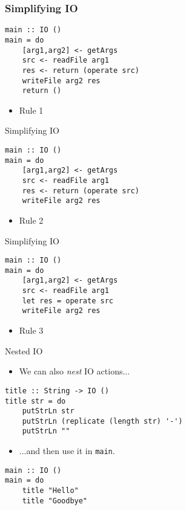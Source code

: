 \documentclass{beamer}
\begin{document}
\begin{frame}[containsverbatim]
\frametitle{Simplifying IO}
\begin{lstlisting}
main :: IO ()
main = do
    [arg1,arg2] <- getArgs
    src <- readFile arg1
    res <- return (operate src)
    writeFile arg2 res
    return ()
\end{lstlisting}
\begin{itemize}
\item Rule 1
\end{itemize}
\end{frame}

\begin{frame}[containsverbatim]{Simplifying IO}
\begin{lstlisting}
main :: IO ()
main = do
    [arg1,arg2] <- getArgs
    src <- readFile arg1
    res <- return (operate src)
    writeFile arg2 res
\end{lstlisting}
\begin{itemize}
\item Rule 2
\end{itemize}
\end{frame}

\begin{frame}[containsverbatim]{Simplifying IO}
\begin{lstlisting}
main :: IO ()
main = do
    [arg1,arg2] <- getArgs
    src <- readFile arg1
    let res = operate src
    writeFile arg2 res
\end{lstlisting}
\begin{itemize}
\item Rule 3
\end{itemize}
\end{frame}

\begin{frame}[containsverbatim]{Nested IO}
\begin{itemize}
\item We can also \emph{nest} IO actions...
\end{itemize}
\begin{lstlisting}
title :: String -> IO ()
title str = do
    putStrLn str
    putStrLn (replicate (length str) '-')
    putStrLn ""
\end{lstlisting}
\begin{itemize}
\item ...and then use it in \lstinline{main}.
\end{itemize}
\begin{lstlisting}
main :: IO ()
main = do
    title "Hello"
    title "Goodbye"
\end{lstlisting}
\end{frame}
\end{document}
